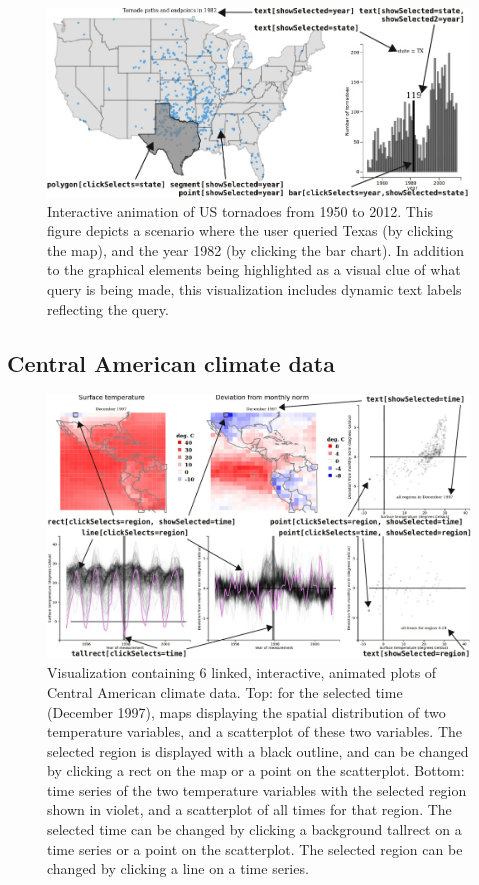 \documentclass[12pt,]{article}
\theoremstyle{definition}
\theoremstyle{definition}
\theoremstyle{definition}
\theoremstyle{remark}
\begin{document}
\begin{figure}
\centering
\includegraphics{images/figure-tornado}
\caption{\label{fig:tornado}Interactive animation of US tornadoes from 1950
to 2012. This figure depicts a scenario where the user queried Texas (by
clicking the map), and the year 1982 (by clicking the bar chart). In
addition to the graphical elements being highlighted as a visual clue of
what query is being made, this visualization includes dynamic text
labels reflecting the query.}
\end{figure}

\hypertarget{central-american-climate-data}{%
\subsection{Central American climate
data}\label{central-american-climate-data}}

\begin{figure}
\centering
\includegraphics{images/figure-climate}
\caption{\label{fig:climate}Visualization containing 6 linked, interactive,
animated plots of Central American climate data. Top: for the selected
time (December 1997), maps displaying the spatial distribution of two
temperature variables, and a scatterplot of these two variables. The
selected region is displayed with a black outline, and can be changed by
clicking a rect on the map or a point on the scatterplot. Bottom: time
series of the two temperature variables with the selected region shown
in violet, and a scatterplot of all times for that region. The selected
time can be changed by clicking a background tallrect on a time series
or a point on the scatterplot. The selected region can be changed by
clicking a line on a time series.}
\end{figure}
\end{document}
